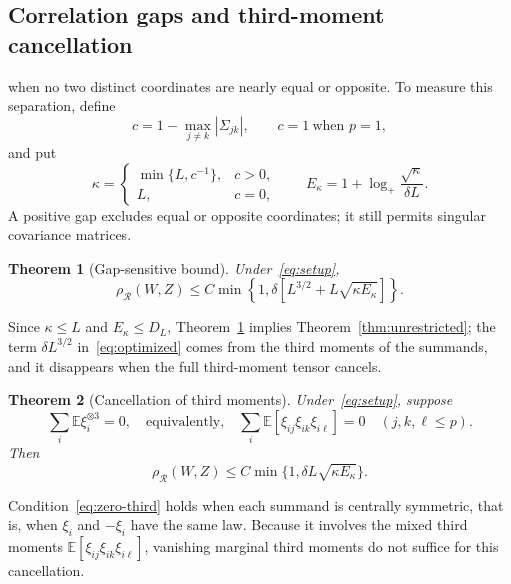 \documentclass[11pt,letterpaper]{article}
\newif\ifshowpolish
\newcommand{\polish}[1]{\ifshowpolish{\color{magenta}%
\hypersetup{linkcolor=magenta,citecolor=magenta,urlcolor=magenta}#1}\else#1\fi}
\newif\ifshowrev
\newcommand{\rev}[1]{\ifshowrev{\color{revblue}%
\hypersetup{linkcolor=revblue,citecolor=revblue,urlcolor=revblue}#1}\else#1\fi}
\newif\ifshowpass
\newcommand{\pass}[1]{\ifshowpass{\color{revblue}%
\hypersetup{linkcolor=revblue,citecolor=revblue,urlcolor=revblue}#1}\else#1\fi}
\newif\ifshowlin
\newcommand{\lin}[1]{\ifshowlin{\color{revblue}%
\hypersetup{linkcolor=revblue,citecolor=revblue,urlcolor=revblue}#1}\else#1\fi}
\newif\ifshowintro
\newcommand{\itx}[1]{\ifshowintro{\color{revblue}%
\hypersetup{linkcolor=revblue,citecolor=revblue,urlcolor=revblue}#1}\else#1\fi}
\newtheorem{theorem}{Theorem}
\theoremstyle{remark}
\newcommand{\E}{\mathbb E}
\newcommand{\rh}{\rho_{\mathcal R}}
\begin{document}
\subsection{Correlation gaps and third-moment cancellation}
\polish{ when no two distinct coordinates are nearly
equal or opposite. To measure this separation, define}
\[
 c=1-\max_{j\ne k}|\Sigma_{jk}|,
 \qquad c=1\ \text{when }p=1,
\]
and put
\begin{equation}
 \kappa=\begin{cases}\min\{L,c^{-1}\},&c>0,\\L,&c=0,\end{cases}
 \qquad E_\kappa=1+\log_+\frac{\sqrt\kappa}{\delta L}.
 \label{eq:parameters}
\end{equation}
A positive gap excludes equal or opposite coordinates; it still permits
singular covariance matrices.

\begin{theorem}[Gap-sensitive bound]\label{thm:optimized}
Under~\eqref{eq:setup},
\begin{equation}
 \rh(W,Z)\le C\min\!\left\{1,
 \delta[L^{3/2}+L\sqrt{\kappa E_\kappa}]\right\}.
 \tag{R*}\label{eq:optimized}
\end{equation}
\end{theorem}

\rev{Since \(\kappa\le L\) and \(E_\kappa\le D_L\),
Theorem~\ref{thm:optimized} implies Theorem~\ref{thm:unrestricted}\pass{;
the} term \(\delta L^{3/2}\) \pass{in~\eqref{eq:optimized}} comes from the
\lin{third moments of the summands},
and it disappears when the full third-moment tensor cancels.}

\begin{theorem}[Cancellation of third moments]\label{thm:zero-skew}
Under~\eqref{eq:setup}, suppose
\begin{equation}
 \sum_i\E\xi_i^{\otimes3}=0,
 \quad\text{equivalently,}\quad
 \sum_i\E[\xi_{ij}\xi_{ik}\xi_{i\ell}]=0
 \quad(j,k,\ell\le p).
 \label{eq:zero-third}
\end{equation}
Then
\begin{equation}
 \rh(W,Z)\le C\min\{1,\delta L\sqrt{\kappa E_\kappa}\}.
 \tag{ZS}\label{eq:zero-skew}
\end{equation}
\end{theorem}

\itx{Condition~\eqref{eq:zero-third} holds when each summand is centrally
symmetric, that is, when \(\xi_i\) and \(-\xi_i\) have the same law. Because it
involves the mixed third moments \(\E[\xi_{ij}\xi_{ik}\xi_{i\ell}]\), vanishing
marginal third moments do not suffice for this cancellation.}
\end{document}

